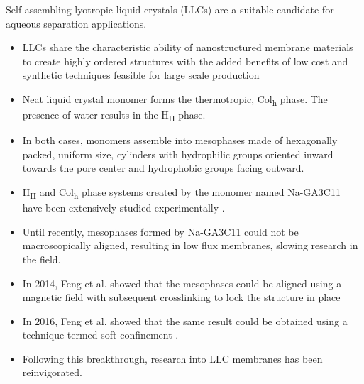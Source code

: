 \documentclass{article}
\begin{document}
  Self assembling lyotropic liquid crystals (LLCs) are a suitable candidate for
  aqueous separation applications. 
  \begin{itemize}
    \item LLCs share the characteristic ability of nanostructured membrane
    materials to create highly ordered structures with the added benefits
    of low cost and synthetic techniques feasible for 
    large scale production \cite{feng_scalable_2014}
    \item Neat liquid crystal monomer forms the thermotropic, Col\textsubscript{h}
    phase. The presence of water results in the H\textsubscript{II} phase.
    \item In both cases, monomers assemble into mesophases made of hexagonally
    packed, uniform size, cylinders with hydrophilic groups oriented inward
    towards the pore center and hydrophobic groups facing outward.
    \item H\textsubscript{II} and Col\textsubscript{h} phase systems created by
    the monomer named Na-GA3C11 have been extensively studied experimentally \cite{smith_ordered_1997, %
    zhou_supported_2005,resel_h2-phase_2000,feng_scalable_2014,feng_thin_2016}. 
    \item Until recently, mesophases formed by Na-GA3C11 could not be macroscopically
    aligned, resulting in low flux membranes, slowing research in the field.
    \item In 2014, Feng et al. showed that the mesophases could be aligned 
    using a magnetic field with subsequent crosslinking to lock the structure
    in place \cite{feng_scalable_2014}
    \item In 2016, Feng et al. showed that the same result could be obtained 
    using a technique termed soft confinement \cite{feng_thin_2016}.
    \item Following this breakthrough, research into LLC membranes has been
    reinvigorated.
  \end{itemize}
 
\end{document}

